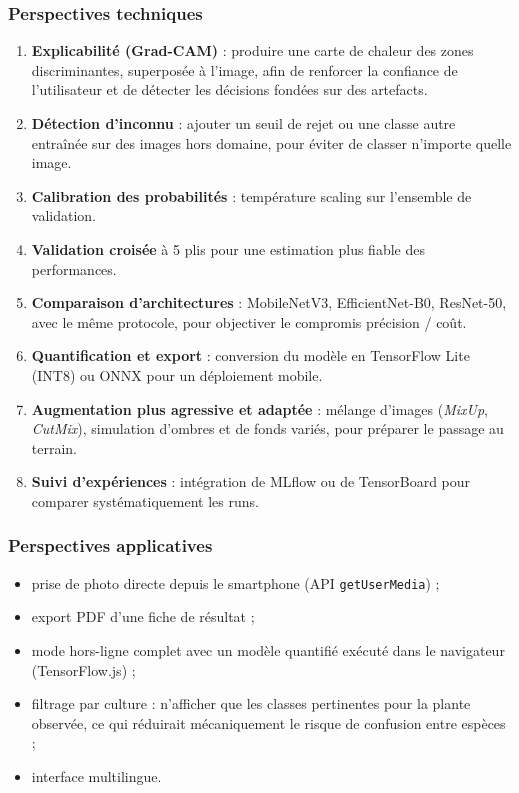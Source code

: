 \documentclass[10pt,a4paper]{article}
\begin{document}
\subsubsection{Perspectives techniques}

\begin{enumerate}
\item \textbf{Explicabilité (Grad-CAM)} : produire une carte de chaleur des zones discriminantes, superposée à l'image, afin de renforcer la confiance de l'utilisateur et de détecter les décisions fondées sur des artefacts.
\item \textbf{Détection d'inconnu} : ajouter un seuil de rejet ou une classe \guillemotleft{} autre \guillemotright{} entraînée sur des images hors domaine, pour éviter de classer n'importe quelle image.
\item \textbf{Calibration des probabilités} : température scaling sur l'ensemble de validation.
\item \textbf{Validation croisée} à 5 plis pour une estimation plus fiable des performances.
\item \textbf{Comparaison d'architectures} : MobileNetV3, EfficientNet-B0, ResNet-50, avec le même protocole, pour objectiver le compromis précision / coût.
\item \textbf{Quantification et export} : conversion du modèle en TensorFlow Lite (INT8) ou ONNX pour un déploiement mobile.
\item \textbf{Augmentation plus agressive et adaptée} : mélange d'images (\emph{MixUp}, \emph{CutMix}), simulation d'ombres et de fonds variés, pour préparer le passage au terrain.
\item \textbf{Suivi d'expériences} : intégration de MLflow ou de TensorBoard pour comparer systématiquement les runs.
\end{enumerate}

\subsubsection{Perspectives applicatives}

\begin{itemize}
\item prise de photo directe depuis le smartphone (API \texttt{getUserMedia}) ;
\item export PDF d'une fiche de résultat ;
\item mode hors-ligne complet avec un modèle quantifié exécuté dans le navigateur (TensorFlow.js) ;
\item filtrage par culture : n'afficher que les classes pertinentes pour la plante observée, ce qui réduirait mécaniquement le risque de confusion entre espèces ;
\item interface multilingue.
\end{itemize}
\end{document}
